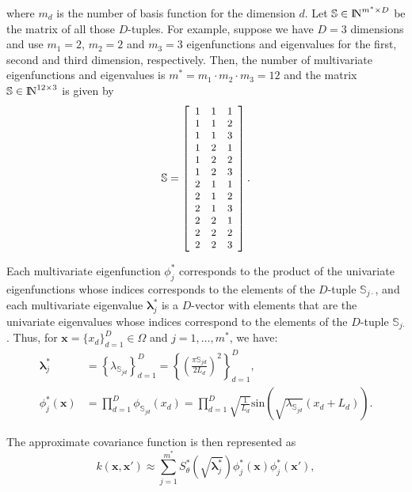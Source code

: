 \documentclass[onecolumn,a4paper,11pt]{article}
\begin{document}
\noindent where $m_d$ is the number of basis function for the dimension $d$. Let $\mathbb{S}\in {\rm I\!N}^{m^{\ast} \times D}$ be the matrix of all those $D$-tuples. For example, suppose we have $D=3$ dimensions and use $m_{1}=2$, $m_{2}=2$ and $m_{3}=3$ eigenfunctions and eigenvalues for the first, second and third dimension, respectively. Then, the number of multivariate eigenfunctions and eigenvalues is $m^{\ast} = m_{1} \cdot m_{2} \cdot m_{3} = 12$ and the matrix $\mathbb{S}\in {\rm I\!N}^{12 \times 3}$ is given by
\begin{align}\small
\mathbb{S}=
\left[ {\begin{array}{ccc}
1 & 1 & 1 \nonumber \\
1 & 1 & 2 \\
1 & 1 & 3 \\
1 & 2 & 1 \\
1 & 2 & 2 \\
1 & 2 & 3 \\
2 & 1 & 1 \\
2 & 1 & 2 \\
2 & 1 & 3 \\
2 & 2 & 1 \\
2 & 2 & 2 \\
2 & 2 & 3 
\end{array} } \right].
\end{align} 

Each multivariate eigenfunction $\phi^{\ast}_j$ corresponds to the product of the univariate eigenfunctions whose indices corresponds to the elements of the $D$-tuple $\mathbb{S}_{j\cdotp}$, and each multivariate eigenvalue $\bm{\lambda}^{\ast}_j$ is a $D$-vector with elements that are the univariate eigenvalues whose indices correspond to the elements of the $D$-tuple $\mathbb{S}_{j\bm{\cdotp}}$. Thus, for $\bm{x}=\{x_d\}_{d=1}^D \in \Omega$ and $j=1,\ldots,m^{\ast}$, we have: 
%
\begin{align}
\bm{\lambda}^{\ast}_j &= \left\{ \lambda_{\mathbb{S}_{jd}} \right\}_{d=1}^D =  \left\{ \left(\tfrac{\pi \mathbb{S}_{jd}}{2L_d}\right)^2 \right\}_{d=1}^D, \label{eq_eigenvalue_multi} \\
%
\phi^{\ast}_j(\bm{x}) &= \prod_{d=1}^{D} \phi_{\mathbb{S}_{jd}}(x_d) = \prod_{d=1}^{D} \sqrt{\frac{1}{L_d}} \text{sin}\left(\sqrt{\lambda_{\mathbb{S}_{jd}}}(x_d+L_d)\right). \label{eq_eigenfunction_multi}
\end{align}

\noindent The approximate covariance function is then represented as
%
\begin{equation}\label{eq_approxcov_multi}
k(\bm{x},\bm{x}') \approx \sum_{j=1}^{m^{\ast}} 
S^{\ast}_{\theta}\left(\sqrt{\bm{\lambda}^{\ast}_j}\right)
\phi^{\ast}_j(\bm{x}) \phi^{\ast}_j(\bm{x}'),
\end{equation}
\end{document}
